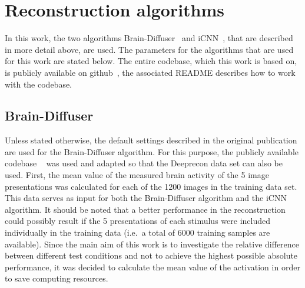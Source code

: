 


\section{Reconstruction algorithms}

In this work, the two algorithms Brain-Diffuser~\cite{ozcelikNaturalSceneReconstruction2023} and iCNN~\cite{shenDeepImageReconstruction2019}, that are described in more detail above, are used. The parameters for the algorithms that are used for this work are stated below. The entire codebase, which this work is based on, is publicly available on github~\cite{mildenbergerKamitaniLabBrain_diffuser}, the associated README describes how to work with the codebase. 

\subsection{Brain-Diffuser}
Unless stated otherwise, the default settings described in the original publication are used for the Brain-Diffuser algorithm. For this purpose, the publicly available codebase ~\cite{ozcelikOzcelikfuBraindiffuser2025} was used and adapted so that the Deeprecon data set can also be used.
First, the mean value of the measured brain activity of the 5 image presentations was calculated for each of the 1200 images in the training data set. This data serves as input for both the Brain-Diffuser algorithm and the iCNN algorithm. It should be noted that a better performance in the reconstruction could possibly result if the 5 presentations of each stimulus were included individually in the training data (i.e.\ a total of 6000 training samples are available). Since the main aim of this work is to investigate the relative difference between different test conditions and not to achieve the highest possible absolute performance, it was decided to calculate the mean value of the activation in order to save computing resources.

